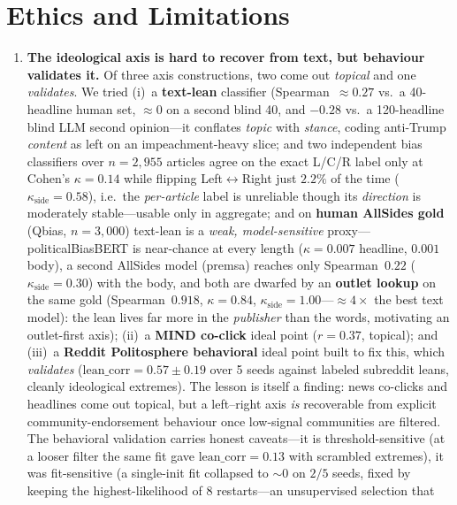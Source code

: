 \documentclass[sigconf,nonacm]{acmart}
\begin{document}
\section{Ethics and Limitations}
\label{sec:ethics}
\begin{enumerate}
  \item \textbf{The ideological axis is hard to recover from text, but
  behaviour validates it.} Of three axis constructions, two come out \emph{topical}
  and one \emph{validates}. We tried (i)~a \textbf{text-lean} classifier
  (Spearman~$\approx0.27$ vs.\ a 40-headline human set, $\approx0$ on a second blind
  40, and $-0.28$ vs.\ a 120-headline blind LLM second opinion---it conflates
  \emph{topic} with \emph{stance}, coding anti-Trump \emph{content} as left on an
  impeachment-heavy slice; and two independent bias classifiers over $n{=}2{,}955$
  articles agree on the exact L/C/R label only at Cohen's $\kappa{=}0.14$ while
  flipping Left$\leftrightarrow$Right just $2.2\%$ of the time
  ($\kappa_{\mathrm{side}}{=}0.58$), i.e.\ the \emph{per-article} label is unreliable
  though its \emph{direction} is moderately stable---usable only in aggregate; and on
  \textbf{human AllSides gold} (Qbias, $n{=}3{,}000$) text-lean is a \emph{weak,
  model-sensitive} proxy---politicalBiasBERT is near-chance at every length
  ($\kappa{=}0.007$ headline, $0.001$ body), a second AllSides model (premsa) reaches only
  Spearman~$0.22$ ($\kappa_{\mathrm{side}}{=}0.30$) with the body, and both are dwarfed by an
  \textbf{outlet lookup} on the same gold (Spearman~$0.918$, $\kappa{=}0.84$,
  $\kappa_{\mathrm{side}}{=}1.00$---${\approx}4\times$ the best text model): the lean lives far
  more in the \emph{publisher} than the words, motivating an outlet-first axis); (ii)~a
  \textbf{MIND co-click} ideal point ($r=0.37$, topical); and (iii)~a \textbf{Reddit
  Politosphere behavioral} ideal point built to fix this, which \emph{validates}
  ($\mathrm{lean\_corr}=0.57\pm0.19$ over 5 seeds against labeled subreddit leans,
  cleanly ideological extremes). The lesson is itself a finding: news co-clicks and
  headlines come out topical, but a left--right axis \emph{is} recoverable from explicit
  community-endorsement behaviour once low-signal communities are filtered. The
  behavioral validation carries honest caveats---it is threshold-sensitive (at a
  looser filter the same fit gave $\mathrm{lean\_corr}=0.13$ with scrambled extremes),
  it was fit-sensitive (a single-init fit collapsed to ${\sim}0$ on $2/5$ seeds, fixed
  by keeping the highest-likelihood of 8 restarts---an unsupervised selection that

\end{enumerate}
\end{document}
